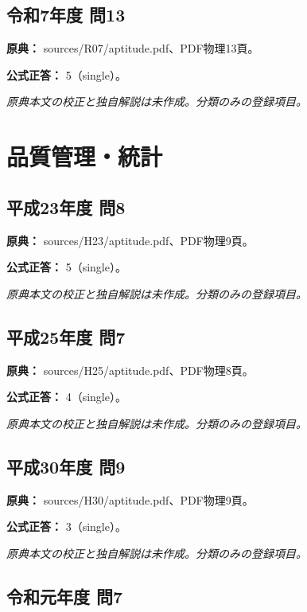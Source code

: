 \subsection{令和7年度 問13}
\label{q:r07-reg-apt-13}

\noindent\textbf{原典：} sources/R07/aptitude.pdf、PDF物理13頁。

\textbf{公式正答：} 5（single）。

\par\textit{原典本文の校正と独自解説は未作成。分類のみの登録項目。}

\section{品質管理・統計}

\subsection{平成23年度 問8}
\label{q:h23-reg-apt-08}

\noindent\textbf{原典：} sources/H23/aptitude.pdf、PDF物理9頁。

\textbf{公式正答：} 5（single）。

\par\textit{原典本文の校正と独自解説は未作成。分類のみの登録項目。}

\subsection{平成25年度 問7}
\label{q:h25-reg-apt-07}

\noindent\textbf{原典：} sources/H25/aptitude.pdf、PDF物理8頁。

\textbf{公式正答：} 4（single）。

\par\textit{原典本文の校正と独自解説は未作成。分類のみの登録項目。}

\subsection{平成30年度 問9}
\label{q:h30-reg-apt-09}

\noindent\textbf{原典：} sources/H30/aptitude.pdf、PDF物理9頁。

\textbf{公式正答：} 3（single）。

\par\textit{原典本文の校正と独自解説は未作成。分類のみの登録項目。}

\subsection{令和元年度 問7}
\label{q:r01-reg-apt-07}

